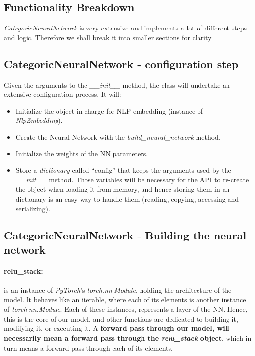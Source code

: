 \documentclass[a4paper, 11pt]{report}
\begin{document}
    \subsection{Functionality Breakdown}
    \textit{CategoricNeuralNetwork} is very extensive and implements a lot of different steps and logic. Therefore we shall break it into smaller sections for clarity

    \subsection{CategoricNeuralNetwork - configuration step}
    Given the arguments to the \textit{\_\_init\_\_} method, the class will undertake an extensive configuration process. It will:
    \begin{itemize}
        \item Initialize the object in charge for NLP embedding (instance of \textit{NlpEmbedding}).
        \item Create the Neural Network with the \textit{build\_neural\_network} method.
        \item Initialize the weights of the NN parameters.
        \item Store a \textit{dictionary} called ``config'' that keeps the arguments used by the \textit{\_\_init\_\_} method. Those variables will be necessary for the API to re-create the object when loading it from memory, and hence storing them in an dictionary is an easy way to handle them (reading, copying, accessing and serializing).
    \end{itemize}

    \subsection{CategoricNeuralNetwork - Building the neural network}\label{Section: Methodology_NN_init}
    \paragraph{relu\_stack:} is an instance of \textit{PyTorch}'s \textit{torch.nn.Module}, holding the architecture of the model. It behaves like an iterable, where each of its elements is another instance of \textit{torch.nn.Module}. Each of these instances, represents a layer of the NN. Hence, this is the core of our model, and other functions are dedicated to building it, modifying it, or executing it. A \textbf{forward pass through our model, will necessarily mean a forward pass through the \textit{relu\_stack} object}, which in turn means a forward pass through each of its elements.
\end{document}

